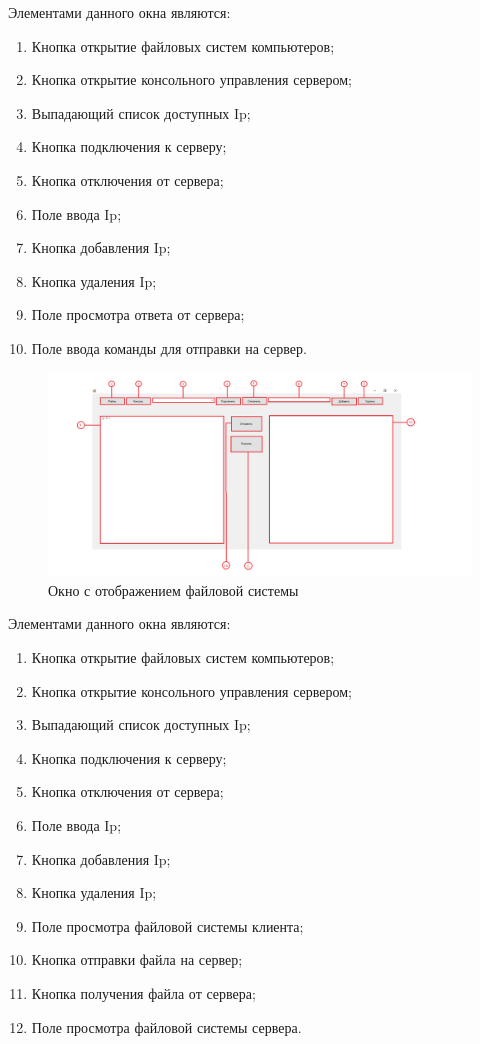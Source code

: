 Элементами данного окна являются:
\begin{enumerate}
	\item Кнопка открытие файловых систем компьютеров;
	\item Кнопка открытие консольного управления сервером;
	\item Выпадающий список доступных Ip;
	\item Кнопка подключения к серверу;
	\item Кнопка отключения от сервера;
	\item Поле ввода Ip;
	\item Кнопка добавления Ip;
	\item Кнопка удаления Ip;
	\item Поле просмотра ответа от сервера;
	\item Поле ввода команды для отправки на сервер.
\end{enumerate}

\begin{figure}
	\centering
	\includegraphics[width=0.9\linewidth]{"images/Окно с файлами"}
	\caption{Окно с отображением файловой системы}
	\label{fig:-window-file}
\end{figure}

Элементами данного окна являются:
\begin{enumerate}
	\item Кнопка открытие файловых систем компьютеров;
	\item Кнопка открытие консольного управления сервером;
	\item Выпадающий список доступных Ip;
	\item Кнопка подключения к серверу;
	\item Кнопка отключения от сервера;
	\item Поле ввода Ip;
	\item Кнопка добавления Ip;
	\item Кнопка удаления Ip;
	\item Поле просмотра файловой системы клиента;
	\item Кнопка отправки файла на сервер;
	\item Кнопка получения файла от сервера;
	\item Поле просмотра файловой системы сервера.
\end{enumerate}

